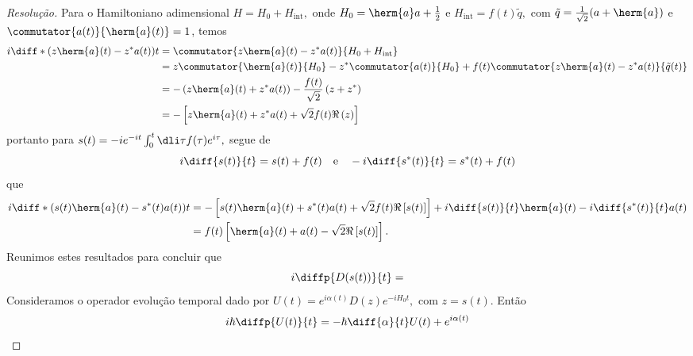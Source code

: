 \begin{proof}[Resolução]
   Para o Hamiltoniano adimensional \(H = H_0 + H_{\mathrm{int}},\) onde \(H_0 = \herm{a}a + \frac12\) e \(H_{\mathrm{int}} = f(t)\tilde{q},\) com \(\tilde{q} = \frac1{\sqrt{2}} (a + \herm{a})\) e \(\commutator{a(t)}{\herm{a}(t)} = 1\), temos
   \begin{align*}
      i\diff*{\left(z \herm{a}(t) - z^* a(t)\right)}{t} &= \commutator{z \herm{a}(t) - z^* a(t)}{H_0 + H_\mathrm{int}}\\
                                                                   &= z \commutator{\herm{a}(t)}{H_0} - z^*\commutator{a(t)}{H_0} + f(t) \commutator{z\herm{a}(t) - z^*a(t)}{\tilde{q}(t)}\\
                                                                   &= -\left(z \herm{a}(t) + z^* a(t)\right) -\frac{f(t)}{\sqrt{2}}\left(z +z^*\right)\\
                                                                   &= - \left[z \herm{a}(t) + z^* a(t) + \sqrt{2} f(t) \Re\left(z\right)\right]
   \end{align*}
   portanto para \(s(t) = -i e^{-it} \int_0^t \dli\tau f(\tau) e^{i \tau},\) segue de
   \begin{equation*}
      i\diff{s(t)}{t} = s(t) + f(t)\quad\text{e}\quad -i\diff{s^*(t)}{t} = s^*(t) + f(t)
   \end{equation*}
   que
   \begin{align*}
      i \diff*{\left(s(t) \herm{a}(t) - s^*(t) a(t)\right)}{t} 
      &= - \left[s(t) \herm{a}(t) + s^*(t) a(t) + \sqrt{2} f(t) \Re\left[s(t)\right]\right]+ i \diff{s(t)}{t} \herm{a}(t) - i \diff{s^*(t)}{t} a(t)\\
      &= f(t) \left[\herm{a}(t) + a(t) - \sqrt{2} \Re\left[s(t)\right]\right].
   \end{align*}
   Reunimos estes resultados para concluir que
   \begin{equation*}
      i \diffp{D(s(t))}{t} = 
   \end{equation*}
   Consideramos o operador evolução temporal dado por \(U(t) = e^{i \alpha (t)} D(z) e^{-i H_0 t},\) com \(z = s(t).\) Então
   \begin{equation*}
      i \hbar \diffp{U(t)}{t} = - \hbar \diff{\alpha}{t} U(t) + e^{i \alpha(t)}
   \end{equation*}
\end{proof}
